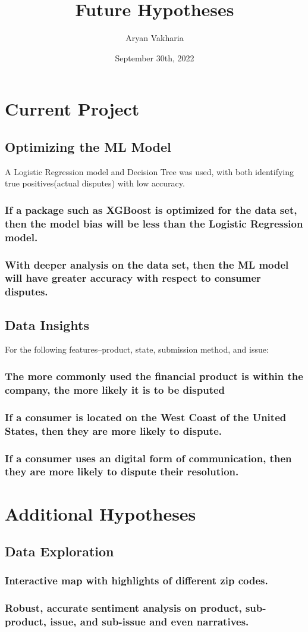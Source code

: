 \documentclass{report}
\title{Future Hypotheses}
\author{Aryan Vakharia}
\date{September 30th, 2022}
\begin{document}
\maketitle

\chapter{Current Project}

\section{Optimizing the ML Model}
A Logistic Regression model and Decision Tree was used, with both identifying true positives(actual disputes) with low accuracy.
\subsection{If a package such as XGBoost is optimized for the data set, then the model bias will be less than the Logistic Regression model.}
\subsection{With deeper analysis on the data set, then the ML model will have greater accuracy with respect to consumer disputes.}

\section{Data Insights}
For the following features–product, state, submission method, and issue:
\subsection{The more commonly used the financial product is within the company, the more likely it is to be disputed}
\subsection{If a consumer is located on the West Coast of the United States, then they are more likely to dispute.}
\subsection{If a consumer uses an digital form of communication, then they are more likely to dispute their resolution.}


\chapter{Additional Hypotheses}

\section{Data Exploration}
\subsection{Interactive map with highlights of different zip codes.}
\subsection{Robust, accurate sentiment analysis on product, sub-product, issue, and sub-issue and even narratives.}
\end{document}
